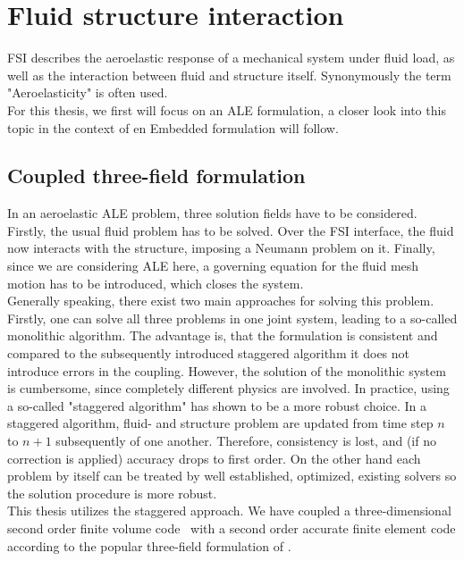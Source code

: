 \documentclass[../main.tex]{subfiles}
\begin{document}
\setlength{\delimitershortfall}{0pt}
\section{Fluid structure interaction}
\acf{FSI} describes the aeroelastic response of a mechanical system under fluid load, as well as the interaction between fluid and structure itself. Synonymously the term "Aeroelasticity" is often used.\\

For this thesis, we first will focus on an \ac{ALE} formulation, a closer look into this topic in the context of en Embedded formulation will follow.\\

\subsection{Coupled three-field formulation}
In an aeroelastic ALE problem, three solution fields have to be considered. Firstly, the usual fluid problem has to be solved. Over the \ac{FSI} interface, the fluid now interacts with the structure, imposing a Neumann problem on it. Finally, since we are considering \ac{ALE} here, a governing equation for the fluid mesh motion has to be introduced, which closes the system.\\
Generally speaking, there exist two main approaches for solving this problem. Firstly, one can solve all three problems in one joint system, leading to a so-called monolithic algorithm. The advantage is, that the formulation is consistent and compared to the subsequently introduced staggered algorithm it does not introduce errors in the coupling. However, the solution of the monolithic system is cumbersome, since completely different physics are involved.
In practice, using a so-called "staggered algorithm" has shown to be a more robust choice. In a staggered algorithm, fluid- and structure problem are updated from time step $n$ to $n+1$ subsequently of one another. Therefore, consistency is lost, and (if no correction is applied) accuracy drops to first order. On the other hand each problem by itself can be treated by well established, optimized, existing solvers so the solution procedure is more robust.\\
This thesis utilizes the staggered approach. We have coupled a three-dimensional second order finite volume code~\cite{Aerof} with a second order accurate finite element code\cite{Aeros} according to the popular three-field formulation of \cite{Farhat1995}.\\
\end{document}

